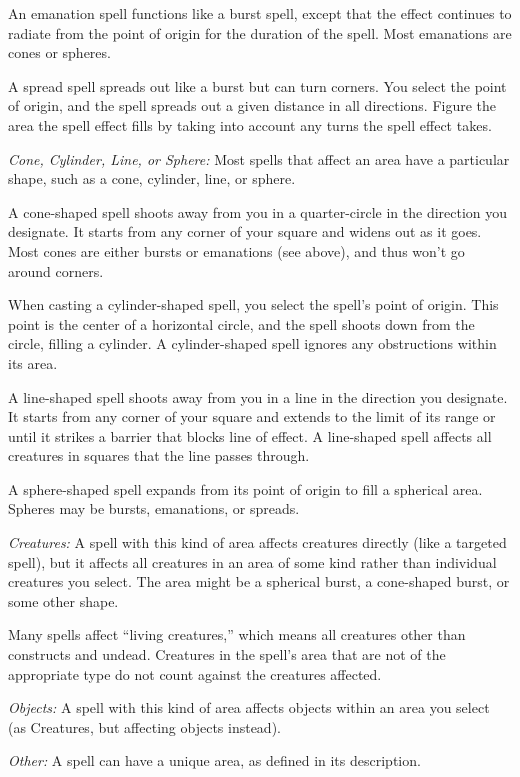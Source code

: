 An emanation spell functions like a burst spell, except that the effect continues to radiate from the point of origin for the duration of the spell. Most emanations are cones or spheres.

A spread spell spreads out like a burst but can turn corners. You select the point of origin, and the spell spreads out a given distance in all directions. Figure the area the spell effect fills by taking into account any turns the spell effect takes.

\textit{Cone, Cylinder, Line, or Sphere:} Most spells that affect an area have a particular shape, such as a cone, cylinder, line, or sphere.

A cone-shaped spell shoots away from you in a quarter-circle in the direction you designate. It starts from any corner of your square and widens out as it goes. Most cones are either bursts or emanations (see above), and thus won't go around corners.

When casting a cylinder-shaped spell, you select the spell's point of origin. This point is the center of a horizontal circle, and the spell shoots down from the circle, filling a cylinder. A cylinder-shaped spell ignores any obstructions within its area.

A line-shaped spell shoots away from you in a line in the direction you designate. It starts from any corner of your square and extends to the limit of its range or until it strikes a barrier that blocks line of effect. A line-shaped spell affects all creatures in squares that the line passes through.

A sphere-shaped spell expands from its point of origin to fill a spherical area. Spheres may be bursts, emanations, or spreads.

\textit{Creatures:} A spell with this kind of area affects creatures directly (like a targeted spell), but it affects all creatures in an area of some kind rather than individual creatures you select. The area might be a spherical burst, a cone-shaped burst, or some other shape.

Many spells affect ``living creatures,'' which means all creatures other than constructs and undead. Creatures in the spell's area that are not of the appropriate type do not count against the creatures affected.

\textit{Objects:} A spell with this kind of area affects objects within an area you select (as Creatures, but affecting objects instead).

\textit{Other:} A spell can have a unique area, as defined in its description.

